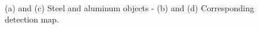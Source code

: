 \graphicspath{ {./Figure/Figure8/}}
\begin{figure}
  \centering
	

  \hspace*{\fill}
   \hfill
  \hspace*{\fill} \\ \hspace*{\fill}
   \hfill
  \hspace*{\fill}
	
	  \caption{(a) and (c) Steel and aluminum objects - (b) and (d) Corresponding detection map.}
		\label{fig:6}
		\end{figure}
